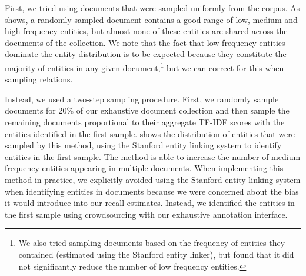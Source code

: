 First, we tried using documents that were sampled uniformly from the corpus.
As  shows, 
a randomly sampled document contains a good range of low, medium and high frequency entities, but almost none of these entities are shared across the documents of the collection.
We note that the fact that low frequency entities dominate the entity distribution is to be expected because they constitute the majority of entities in any given document,\footnote{%
  We also tried sampling documents based on the frequency of entities they contained (estimated using the Stanford entity linker), but found that it did not significantly reduce the number of low frequency entities.} but we can correct for this when sampling relations.

Instead, we used a two-step sampling procedure.
First, we randomly sample documents for 20\% of our exhaustive document collection and then sample the remaining documents proportional to their aggregate TF-IDF scores with the entities identified in the first sample.
 shows the distribution of entities that were sampled by this method, using the Stanford entity linking system to identify entities in the first sample.
The method is able to increase the number of medium frequency entities appearing in multiple documents.
When implementing this method in practice, we explicitly avoided using the Stanford entity linking system when identifying entities in documents because we were concerned about the bias it would introduce into our recall estimates.
Instead, we identified the entities in the first sample using crowdsourcing with our exhaustive annotation interface.

